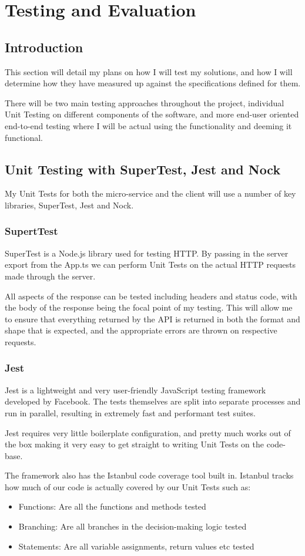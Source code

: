 \chapter{Testing and Evaluation}
\section{Introduction}
This section will detail my plans on how I will test my solutions, and how I will determine how they have measured up against the specifications defined for them.

There will be two main testing approaches throughout the project, individual Unit Testing on different components of the software, and more end-user oriented end-to-end testing where I will be actual using the functionality and deeming it functional. 
\section{Unit Testing with SuperTest, Jest and Nock}
My Unit Tests for both the micro-service and the client will use a number of key libraries, SuperTest, Jest and Nock.
\subsection{SupertTest}
SuperTest is a Node.js library used for testing HTTP. By passing in the server export from the App.ts we can perform Unit Tests on the actual HTTP requests made through the server.

All aspects of the response can be tested including headers and status code, with the body of the response being the focal point of my testing. This will allow me to ensure that everything returned by the API is returned in both the format and shape that is expected, and the appropriate errors are thrown on respective requests.
\subsection{Jest}
Jest is a lightweight and very user-friendly JavaScript testing framework developed by Facebook. The tests themselves are split into separate processes and run in parallel, resulting in extremely fast and performant test suites.

Jest requires very little boilerplate configuration, and pretty much works out of the box making it very easy to get straight to writing Unit Tests on the code-base.

The framework also has the Istanbul code coverage tool built in. Istanbul tracks how much of our code is actually covered by our Unit Tests such as:
\begin{itemize}
    \item Functions: Are all the functions and methods tested
    \item Branching: Are all branches in the decision-making logic tested
    \item Statements: Are all variable assignments, return values etc tested
\end{itemize}

